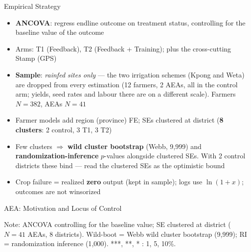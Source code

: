 \documentclass[aspectratio=169]{beamer}
\newcommand{\notefont}{\fontsize{5pt}{6pt}\selectfont}
\begin{document}
\begin{frame}{Empirical Strategy}
\begin{itemize}
	\item \textbf{ANCOVA}: regress endline outcome on treatment status, controlling for
	      the baseline value of the outcome
	\item Arms: T1 (Feedback), T2 (Feedback + Training); plus the cross-cutting Stamp (GPS)
	\item \textbf{Sample}: \emph{rainfed sites only} --- the two irrigation schemes (Kpong and
	      Weta) are dropped from every estimation (12 farmers, 2 AEAs, all in the control arm;
	      yields, seed rates and labour there are on a different scale). Farmers $N=382$, AEAs $N=41$
	\item Farmer models add region (province) FE; SEs clustered at district
	      (\textbf{8 clusters}: 2 control, 3 T1, 3 T2)
	\item Few clusters $\Rightarrow$ \textbf{wild cluster bootstrap} (Webb, 9{,}999) and
	      \textbf{randomization-inference} $p$-values alongside clustered SEs. With 2 control
	      districts these bind --- read the clustered SEs as the optimistic bound
	\item Crop failure = realized \textbf{zero} output (kept in sample); logs use $\ln(1+x)$;
	      outcomes are not winsorized
\end{itemize}
\end{frame}

\begin{frame}{AEA: Motivation and Locus of Control}
	\centering
	\begin{minipage}{0.94\textwidth}
		\notefont
		Note: ANCOVA controlling for the baseline value; SE clustered at district ($N=41$ AEAs, 8 districts).
		Wild-boot = Webb wild cluster bootstrap (9{,}999); RI = randomization inference (1{,}000).
		***, **, * : 1, 5, 10\%.
	\end{minipage}
\end{frame}
\end{document}
